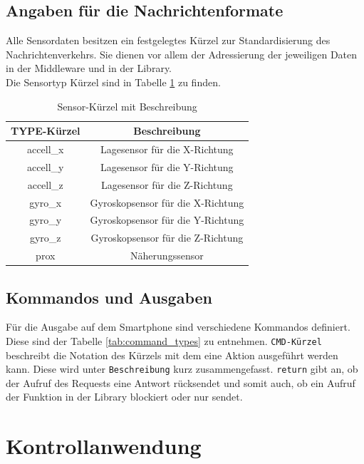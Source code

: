 \documentclass[11pt,a4paper]{report}
\begin{document}
\section{Angaben für die Nachrichtenformate}
Alle Sensordaten besitzen ein festgelegtes Kürzel zur Standardisierung des Nachrichtenverkehrs.
Sie dienen vor allem der Adressierung der jeweiligen Daten in der Middleware und in der Library.
\\
Die Sensortyp Kürzel sind in Tabelle \ref{tab:sensor_types} zu finden. 
\begin{table}[htbp]
  \centering
  \begin{tabular}{|c|c|}
      \hline
      \textbf{TYPE-Kürzel} & \textbf{Beschreibung} \\
      \hline
      accell\_x & Lagesensor für die X-Richtung \\
      \hline
      accell\_y & Lagesensor für die Y-Richtung \\
      \hline
      accell\_z & Lagesensor für die Z-Richtung \\
      \hline
       gyro\_x & Gyroskopsensor für die X-Richtung \\
      \hline
      gyro\_y & Gyroskopsensor für die Y-Richtung \\
      \hline
      gyro\_z & Gyroskopsensor für die Z-Richtung \\
      \hline
      prox & Näherungssensor \\
      \hline
  \end{tabular}
  \caption{Sensor-Kürzel mit Beschreibung}
  \label{tab:sensor_types}
\end{table}

\section{Kommandos und Ausgaben}
Für die Ausgabe auf dem Smartphone sind verschiedene Kommandos definiert.
Diese sind der Tabelle \ref{tab:command_types} zu entnehmen.
\texttt{CMD-Kürzel} beschreibt die Notation des Kürzels mit dem eine Aktion ausgeführt werden kann.
Diese wird unter \texttt{Beschreibung} kurz zusammengefasst.
\texttt{return} gibt an, ob der Aufruf des Requests eine Antwort rücksendet und somit auch, ob ein Aufruf der Funktion in der Library blockiert oder nur sendet.






\chapter{Kontrollanwendung}\label{chap:server_software}
\end{document}
